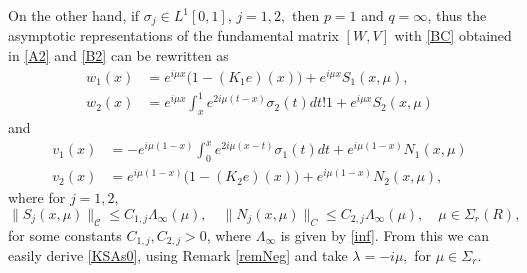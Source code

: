 \documentclass[11pt]{amsart}
\theoremstyle{plain}
\theoremstyle{definition}
\theoremstyle{remark}
\numberwithin{equation}{section}
\begin{document}
On the other hand, if $\sigma_j\in L^1[0,1]$, $j=1,2,$ then $p=1$ and $q=\infty$, thus
the asymptotic representations of the fundamental matrix
$[W,V]$ with \eqref{BC}
obtained in \eqref{A2} and \eqref{B2}
can be rewritten as
\begin{align}\label{Int1}
w_1(x)&=e^{i \mu x}\Big(1-(K_1e)(x)\Big)+ e^{i \mu x}S_1(x,\mu),\\
w_2(x)&=e^{i \mu x}\int_x^1 e^{2i \mu (t-x)}\sigma_2(t)dt   !1
+ e^{i \mu x}S_2(x,\mu)\nonumber
\end{align}
and
\begin{align}\label{Int2}
v_1(x)&=-e^{i \mu (1-x)}\int_0^x e^{2i \mu (x-t)}\sigma_1(t)dt + e^{i \mu (1-x)}N_1(x,\mu)\\
v_2(x)&=e^{i \mu(1-x)}\Big(1-(K_2e)(x)\Big)+ e^{i \mu (1-x)}N_2(x,\mu),
\end{align}
where for $j=1,2,$
\[
\|S_j(x,\mu)\|_{\mathcal C} \leq C_{1,j} \Lambda_\infty(\mu),\quad \|N_j(x,\mu)\|_C \leq C_{2,j} \Lambda_\infty(\mu),\quad\mu\in \Sigma_r(R),
\]
for some constants $C_{1,j}, C_{2,j}>0$, where $\Lambda_\infty$ is given by \eqref{inf}.
From this we can easily derive \eqref{KSAs0}, using Remark \ref{remNeg} and take $\lambda=-i\mu,$ for $\mu\in \Sigma_r$.
\end{document}

